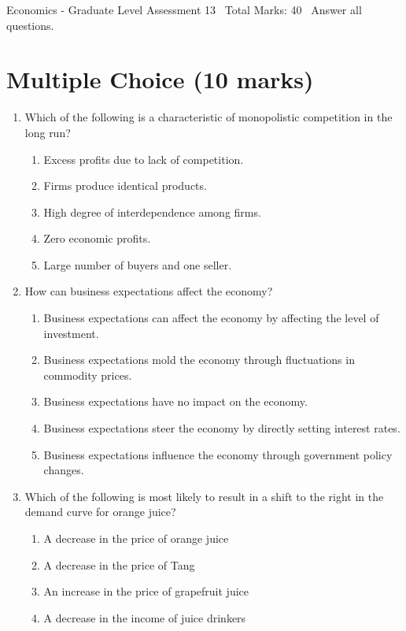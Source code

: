 \documentclass[12pt]{article}
\begin{document}
\begin{center}
Economics - Graduate Level Assessment 13 \
Total Marks: 40 \
Answer all questions.
\end{center}

\section*{Multiple Choice (10 marks)}
\begin{enumerate}[label=\arabic*.]
\item Which of the following is a characteristic of monopolistic competition in the long run?
\begin{enumerate}[label=(\alph*)]
    \item Excess profits due to lack of competition.
    \item Firms produce identical products.
    \item High degree of interdependence among firms.
    \item Zero economic profits.
    \item Large number of buyers and one seller.
\end{enumerate}
\item How can business expectations affect the economy?
\begin{enumerate}[label=(\alph*)]
    \item Business expectations can affect the economy by affecting the level of investment.
    \item Business expectations mold the economy through fluctuations in commodity prices.
    \item Business expectations have no impact on the economy.
    \item Business expectations steer the economy by directly setting interest rates.
    \item Business expectations influence the economy through government policy changes.
\end{enumerate}
\item Which of the following is most likely to result in a shift to the right in the demand curve for orange juice?
\begin{enumerate}[label=(\alph*)]
    \item A decrease in the price of orange juice
    \item A decrease in the price of Tang
    \item An increase in the price of grapefruit juice
    \item A decrease in the income of juice drinkers

\end{enumerate}
\end{enumerate}
\end{document}
